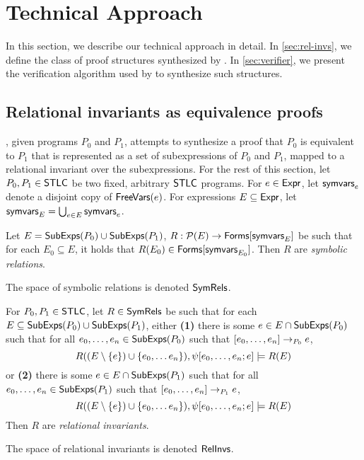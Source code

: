 \section{Technical Approach}
%
In this section, we describe our technical approach in detail.
%
In \autoref{sec:rel-invs}, we define the class of proof
structures synthesized by \sys.
%
In \autoref{sec:verifier}, we present the verification algorithm used
by \sys to synthesize such structures.

\subsection{Relational invariants as equivalence proofs}
\label{sec:rel-invs}
%
\sys, given programs $P_0$ and $P_1$, attempts to synthesize a proof
that $P_0$ is equivalent to $P_1$ that is represented as a set of
subexpressions of $P_0$ and $P_1$, mapped to a relational invariant
over the subexpressions.
%
For the rest of this section, let $P_0, P_1 \in \mathsf{STLC}$ be two fixed,
arbitrary $\mathsf{STLC}$ programs.
%
For $e \in \mathsf{Expr}$, let $\mathsf{symvars}_{e}$ denote a disjoint copy of
$\mathsf{FreeVars}(e)$.
%
For expressions $E \subseteq \mathsf{Expr}$, let $\mathsf{symvars}_{E} = \bigcup_{e
  \in E} \mathsf{symvars}_{e}$.

\begin{defn}
  \label{defn:sym-rels}
  Let $E = \mathsf{SubExps}(P_0) \cup \mathsf{SubExps}(P_1)$,
  $R: \mathcal{P}(E) \to \mathsf{Forms}[  \mathsf{symvars}_{E}  ]$ be such that %
  for each $E_0 \subseteq E$, %
  it holds that $R(E_0) \in \mathsf{Forms}[  \mathsf{symvars}_{E_0}  ]$.
  Then $R$ are \emph{symbolic relations}.
\end{defn}
%
The space of symbolic relations is denoted $\mathsf{SymRels}$.

\begin{defn}
  \label{defn:rel-invs}
  For $P_0, P_1 \in \mathsf{STLC}$, let $R \in \mathsf{SymRels}$ be such that %
  for each $E \subseteq \mathsf{SubExps}(P_0) \cup \mathsf{SubExps}(P_1)$, either %
  \textbf{(1)} there is some $e \in E \cap \mathsf{SubExps}(P_0)$
  such that for all $e_0, \ldots, e_n \in \mathsf{SubExps}(P_0)$ such that %
  $[ e_0, \ldots, e_n ] \rightarrow_{ P_0 } e$, 
  \[ R( (E  \setminus \{  e  \}) \cup \{  e_0, \ldots e_n  \} ),
  \psi[  e_0, \ldots, e_n  ;  e  ] \models
  R(E)
  \] or %
  \textbf{(2)} there is some $e \in E \cap \mathsf{SubExps}(P_1)$
  such that for all $e_0, \ldots, e_n \in \mathsf{SubExps}(P_1)$ such that %
  $[ e_0, \ldots, e_n ] \rightarrow_{ P_1 } e$,
  \[ R( (E  \setminus \{  e  \}) \cup \{  e_0, \ldots e_n  \} ),
  \psi[  e_0, \ldots, e_n  ;  e  ] \models
  R(E)
  \]
  Then $R$ are \emph{relational invariants}.
\end{defn}
%
The space of relational invariants is denoted $\mathsf{RelInvs}$.

